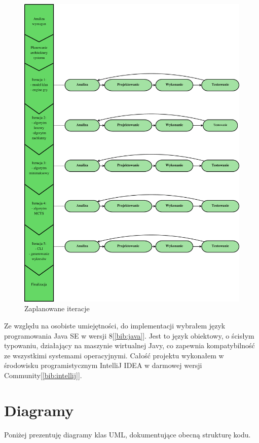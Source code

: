 \clearpage
\begin{figure}[H]
	\centering
	\includegraphics[width=\textwidth]{Resources/diagramIteracje.eps}
	\caption{Zaplanowane iteracje} 
	\label{fig:diagramIteracji}
\end{figure}

Ze względu na osobiste umiejętności, do implementacji wybrałem język programowania Java SE w wersji 8[\ref{bib:java}]. Jest to język obiektowy, o ścisłym typowaniu, działający na maszynie wirtualnej Javy, co zapewnia kompatybilność ze wszystkimi systemami operacyjnymi. Całość projektu wykonałem w środowisku programistycznym IntelliJ IDEA w darmowej wersji Community[\ref{bib:intellij}].

\clearpage
\section{Diagramy}
Poniżej prezentuję diagramy klas UML, dokumentujące obecną strukturę kodu. 
